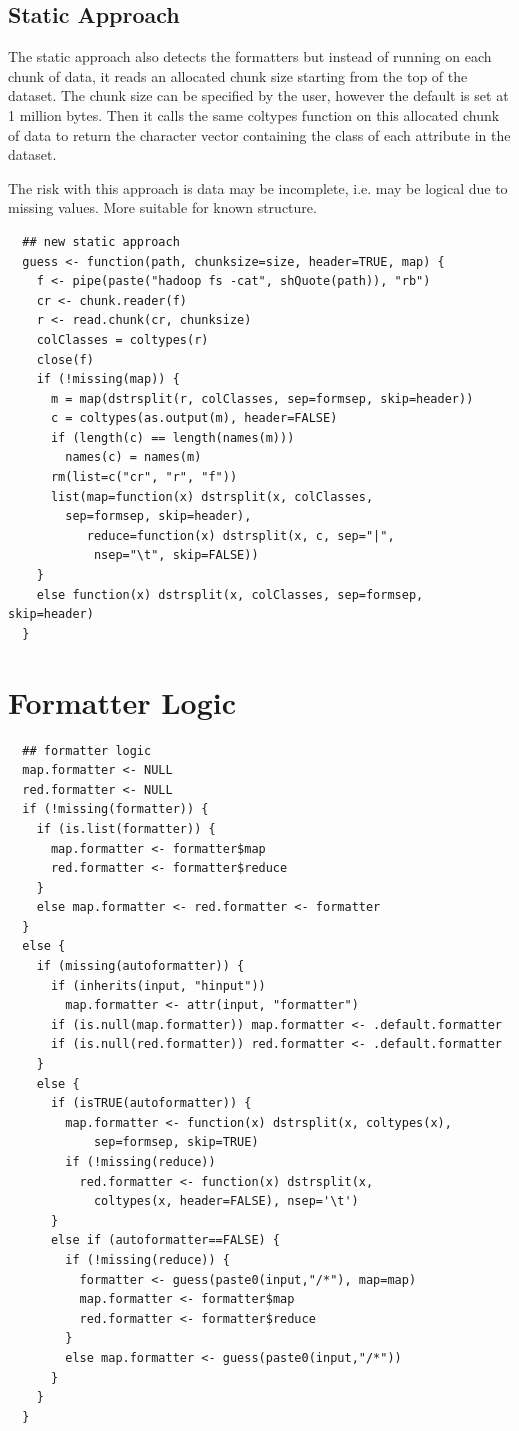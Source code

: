 \documentclass[11pt]{book}
\begin{document}
\subsection{Static Approach}

The static approach also detects the formatters but instead of running on each chunk of data, it reads an allocated chunk size starting from the top of the dataset. The chunk size can be specified by the user, however the default is set at 1 million bytes. Then it calls the same coltypes function on this allocated chunk of data to return the character vector containing the class of each attribute in the dataset.

The risk with this approach is data may be incomplete, i.e. may be logical due to missing values. More suitable for known structure.

\begin{verbatim}
  ## new static approach
  guess <- function(path, chunksize=size, header=TRUE, map) {
    f <- pipe(paste("hadoop fs -cat", shQuote(path)), "rb")
    cr <- chunk.reader(f)
    r <- read.chunk(cr, chunksize)
    colClasses = coltypes(r)
    close(f)
    if (!missing(map)) {
      m = map(dstrsplit(r, colClasses, sep=formsep, skip=header))
      c = coltypes(as.output(m), header=FALSE)
      if (length(c) == length(names(m)))
        names(c) = names(m)
      rm(list=c("cr", "r", "f"))
      list(map=function(x) dstrsplit(x, colClasses, 
      	sep=formsep, skip=header), 
           reduce=function(x) dstrsplit(x, c, sep="|", 
           	nsep="\t", skip=FALSE))
    }
    else function(x) dstrsplit(x, colClasses, sep=formsep, skip=header)
  }
  \end{verbatim}

\section{Formatter Logic}

\begin{verbatim}
  ## formatter logic
  map.formatter <- NULL
  red.formatter <- NULL
  if (!missing(formatter)) {
    if (is.list(formatter)) {
      map.formatter <- formatter$map
      red.formatter <- formatter$reduce
    } 
    else map.formatter <- red.formatter <- formatter
  }
  else {
    if (missing(autoformatter)) {
      if (inherits(input, "hinput"))
        map.formatter <- attr(input, "formatter")
      if (is.null(map.formatter)) map.formatter <- .default.formatter
      if (is.null(red.formatter)) red.formatter <- .default.formatter
    }
    else {
      if (isTRUE(autoformatter)) {
        map.formatter <- function(x) dstrsplit(x, coltypes(x), 
        	sep=formsep, skip=TRUE)
        if (!missing(reduce)) 
          red.formatter <- function(x) dstrsplit(x, 
          	coltypes(x, header=FALSE), nsep='\t')
      }
      else if (autoformatter==FALSE) {
        if (!missing(reduce)) {
          formatter <- guess(paste0(input,"/*"), map=map)
          map.formatter <- formatter$map
          red.formatter <- formatter$reduce
        }
        else map.formatter <- guess(paste0(input,"/*"))
      }
    }
  }
  \end{verbatim}
\end{document}
